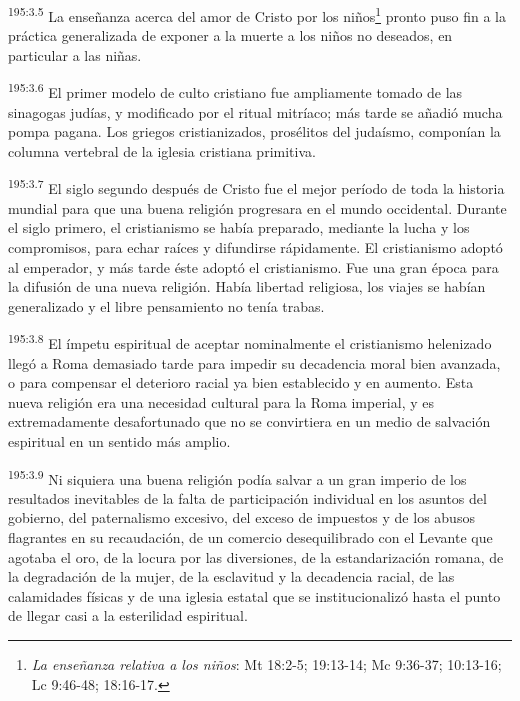 \par
\textsuperscript{195:3.5} La enseñanza acerca del amor de Cristo por los niños\footnote{\textit{La enseñanza relativa a los niños}: Mt 18:2-5; 19:13-14; Mc 9:36-37; 10:13-16; Lc 9:46-48; 18:16-17.} pronto puso fin a la práctica generalizada de exponer a la muerte a los niños no deseados, en particular a las niñas.

\par
\textsuperscript{195:3.6} El primer modelo de culto cristiano fue ampliamente tomado de las sinagogas judías, y modificado por el ritual mitríaco; más tarde se añadió mucha pompa pagana. Los griegos cristianizados, prosélitos del judaísmo, componían la columna vertebral de la iglesia cristiana primitiva.

\par
\textsuperscript{195:3.7} El siglo segundo después de Cristo fue el mejor período de toda la historia mundial para que una buena religión progresara en el mundo occidental. Durante el siglo primero, el cristianismo se había preparado, mediante la lucha y los compromisos, para echar raíces y difundirse rápidamente. El cristianismo adoptó al emperador, y más tarde éste adoptó el cristianismo. Fue una gran época para la difusión de una nueva religión. Había libertad religiosa, los viajes se habían generalizado y el libre pensamiento no tenía trabas.

\par
\textsuperscript{195:3.8} El ímpetu espiritual de aceptar nominalmente el cristianismo helenizado llegó a Roma demasiado tarde para impedir su decadencia moral bien avanzada, o para compensar el deterioro racial ya bien establecido y en aumento. Esta nueva religión era una necesidad cultural para la Roma imperial, y es extremadamente desafortunado que no se convirtiera en un medio de salvación espiritual en un sentido más amplio.

\par
\textsuperscript{195:3.9} Ni siquiera una buena religión podía salvar a un gran imperio de los resultados inevitables de la falta de participación individual en los asuntos del gobierno, del paternalismo excesivo, del exceso de impuestos y de los abusos flagrantes en su recaudación, de un comercio desequilibrado con el Levante que agotaba el oro, de la locura por las diversiones, de la estandarización romana, de la degradación de la mujer, de la esclavitud y la decadencia racial, de las calamidades físicas y de una iglesia estatal que se institucionalizó hasta el punto de llegar casi a la esterilidad espiritual.

